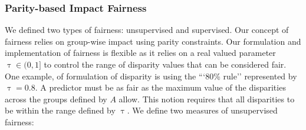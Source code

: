 \subsubsection{Parity-based Impact Fairness}

We defined two types of fairness: unsupervised and supervised. Our concept of fairness relies on group-wise impact using parity constraints. Our formulation and implementation of fairness is flexible as it relies on a real valued parameter $\uptau \in (0,1] $ to control the range of disparity values that can be considered fair. One example, of formulation of disparity is using the ```80\% rule'' represented by $\uptau = 0.8$. A predictor must be as fair as the maximum value of the disparities across the groups defined by $A$ allow. This notion requires that all disparities to be within the range defined by $\uptau$.
We define two measures of unsupervised fairness:
